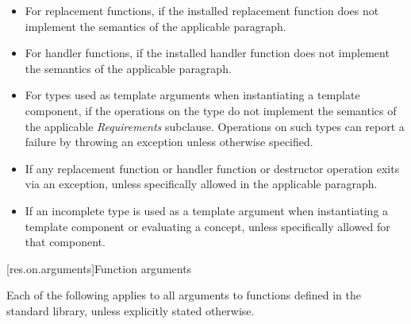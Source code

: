 \begin{itemize}
\item
For replacement functions, if the installed replacement function does not
implement the semantics of the applicable
\required
paragraph.
\item
For handler functions,
if the installed handler function does not implement the semantics of the applicable
\required
paragraph.
\item
For types used as template arguments when instantiating a template component,
if the operations on the type do not implement the semantics of the applicable
\emph{Requirements}
subclause.
Operations on such types can report a failure by throwing an exception
unless otherwise specified.
\item
If any replacement function or handler function or destructor operation exits via an exception,
unless specifically allowed
in the applicable
\required
paragraph.
\item
If an incomplete type is used as a template
argument when instantiating a template component or evaluating a concept, unless specifically
allowed for that component.
\end{itemize}

[res.on.arguments]{Function arguments}

\pnum
{}%
%
Each of the following applies to all arguments
%
to functions defined in the \Cpp{} standard library,%
unless explicitly stated otherwise.

